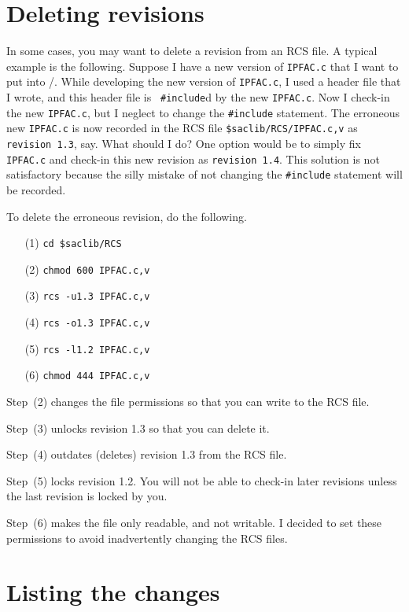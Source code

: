 \section{Deleting revisions}

In some cases, you may want to delete a revision from an RCS
file.
A typical example is the following.
Suppose I have a new version of {\tt IPFAC.c} that I want to put
into \SACLIB/.
While developing the new version of {\tt IPFAC.c}, I used a
header file that I wrote, and this header file is {\tt
\#include}d by the new {\tt IPFAC.c}.
Now I check-in the new {\tt IPFAC.c}, but I neglect to change
the {\tt \#include} statement.
The erroneous new {\tt IPFAC.c} is now recorded in the RCS file
{\tt \$saclib/RCS/IPFAC.c,v} as {\tt revision 1.3}, say.
What should I do?
One option would be to simply fix {\tt IPFAC.c} and check-in
this new revision as {\tt revision 1.4}.
This solution is not satisfactory because the silly mistake of
not changing the {\tt \#include} statement will be recorded.


To delete the erroneous revision, do the following.

\begin{itemize}
\item[(1)] {\tt cd \$saclib/RCS}
\item[(2)] {\tt chmod 600 IPFAC.c,v}
\item[(3)] {\tt rcs -u1.3 IPFAC.c,v}
\item[(4)] {\tt rcs -o1.3 IPFAC.c,v}
\item[(5)] {\tt rcs -l1.2 IPFAC.c,v}
\item[(6)] {\tt chmod 444 IPFAC.c,v}
\end{itemize}

Step~(2) changes the file permissions so that you can write to
the RCS file.

Step~(3) unlocks revision 1.3 so that you can delete it.

Step~(4) outdates (deletes) revision 1.3 from the RCS file.

Step~(5) locks revision 1.2.  You will not be able to check-in
later revisions unless the last revision is locked by you.

Step~(6) makes the file only readable, and not writable.
I decided to set these permissions to avoid inadvertently
changing the RCS files.


\section{Listing the changes}


